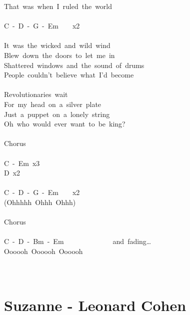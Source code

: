 \documentclass[]{book}
\let\stdsection\section
\renewcommand\section{\clearpage\stdsection}
\begin{document}
That~was~when~I~ruled~the~world\\
~\\
C~-~D~-~G~-~Em~~~~x2\\
~\\
It~was~the~wicked~and~wild~wind~\\
Blew~down~the~doors~to~let~me~in~\\
Shattered~windows~and~the~sound~of~drums~\\
People~couldn't~believe~what~I'd~become~\\
~\\
Revolutionaries~wait~\\
For~my~head~on~a~silver~plate~\\
Just~a~puppet~on~a~lonely~string~\\
Oh~who~would~ever~want~to~be~king?~\\
~\\
Chorus\\
~\\
C~-~Em~x3\\
D~x2\\
~\\
C~-~D~-~G~-~Em~~~~x2\\
(Ohhhhh~Ohhh~Ohhh)\\
~\\
Chorus\\
~\\
C~-~D~-~Bm~-~Em~~~~~~~~~~~~~~and~fading\ldots{}\\
Oooooh~Oooooh~Oooooh\\
~\\
~\\

\hypertarget{suzanne---leonard-cohen}{%
\section{Suzanne - Leonard Cohen}\label{suzanne---leonard-cohen}}
\end{document}
